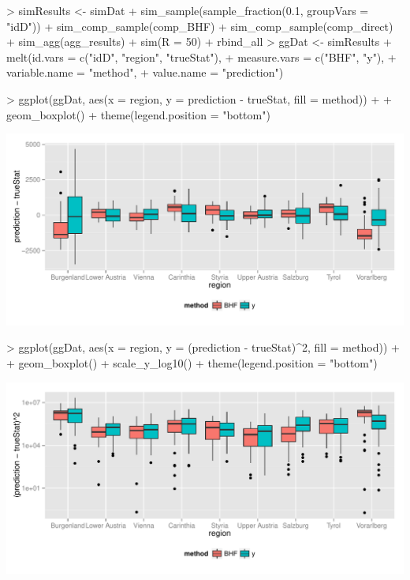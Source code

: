 \documentclass[article]{ajs}
\begin{document}
\begin{Schunk}
\begin{Sinput}
> simResults <- simDat %
+   sim_sample(sample_fraction(0.1, groupVars = "idD")) %
+   sim_comp_sample(comp_BHF) %
+   sim_comp_sample(comp_direct) %
+   sim_agg(agg_results) %
+   sim(R = 50) %
+   rbind_all
> ggDat <- simResults %
+   melt(id.vars = c("idD", "region", "trueStat"), 
+        measure.vars = c("BHF", "y"), 
+        variable.name = "method",
+        value.name = "prediction")
\end{Sinput}
\end{Schunk}

\begin{Schunk}
\begin{Sinput}
> ggplot(ggDat, aes(x = region, y = prediction - trueStat, fill = method)) + 
+   geom_boxplot() + theme(legend.position = "bottom")
\end{Sinput}
\end{Schunk}

\includegraphics[width = \textwidth]{saeSim-designSimBIAS.pdf}

\begin{Schunk}
\begin{Sinput}
> ggplot(ggDat, aes(x = region, y = (prediction - trueStat)^2, fill = method)) + 
+   geom_boxplot() + scale_y_log10() + theme(legend.position = "bottom")
\end{Sinput}
\end{Schunk}

\includegraphics[width = \textwidth]{saeSim-designSimMSE.pdf}
  
\end{document}

